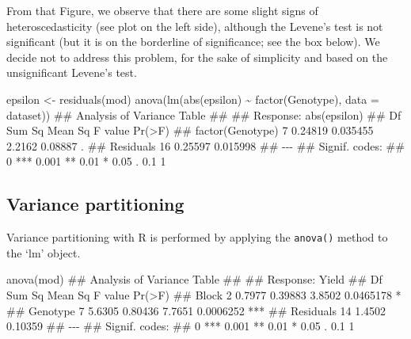 \documentclass[a4paper,12pt,oneside]{book}
\newenvironment{Shaded}{\begin{snugshade}}{\end{snugshade}}
\newcommand{\SpecialCharTok}[1]{#1}
\newcommand{\DocumentationTok}[1]{#1}
\newcommand{\OtherTok}[1]{#1}
\newcommand{\FunctionTok}[1]{#1}
\newcommand{\AttributeTok}[1]{#1}
\newcommand{\NormalTok}[1]{#1}
\begin{document}
From that Figure, we observe that there are some slight signs of heteroscedasticity (see plot on the left side), although the Levene's test is not significant (but it is on the borderline of significance; see the box below). We decide not to address this problem, for the sake of simplicity and based on the unsignificant Levene's test.

\vspace{12pt}

\begin{Shaded}
\begin{Highlighting}[]
\NormalTok{epsilon }\OtherTok{\textless{}{-}} \FunctionTok{residuals}\NormalTok{(mod)}
\FunctionTok{anova}\NormalTok{(}\FunctionTok{lm}\NormalTok{(}\FunctionTok{abs}\NormalTok{(epsilon) }\SpecialCharTok{\textasciitilde{}} \FunctionTok{factor}\NormalTok{(Genotype), }\AttributeTok{data =}\NormalTok{ dataset))}
\DocumentationTok{\#\# Analysis of Variance Table}
\DocumentationTok{\#\# }
\DocumentationTok{\#\# Response: abs(epsilon)}
\DocumentationTok{\#\#                  Df  Sum Sq  Mean Sq F value  Pr(\textgreater{}F)  }
\DocumentationTok{\#\# factor(Genotype)  7 0.24819 0.035455  2.2162 0.08887 .}
\DocumentationTok{\#\# Residuals        16 0.25597 0.015998                  }
\DocumentationTok{\#\# {-}{-}{-}}
\DocumentationTok{\#\# Signif. codes:  }
\DocumentationTok{\#\# 0 \textquotesingle{}***\textquotesingle{} 0.001 \textquotesingle{}**\textquotesingle{} 0.01 \textquotesingle{}*\textquotesingle{} 0.05 \textquotesingle{}.\textquotesingle{} 0.1 \textquotesingle{} \textquotesingle{} 1}
\end{Highlighting}
\end{Shaded}

\hypertarget{variance-partitioning-1}{%
\subsection{Variance partitioning}\label{variance-partitioning-1}}

Variance partitioning with R is performed by applying the \texttt{anova()} method to the `lm' object.

\vspace{12pt}

\begin{Shaded}
\begin{Highlighting}[]
\FunctionTok{anova}\NormalTok{(mod)}
\DocumentationTok{\#\# Analysis of Variance Table}
\DocumentationTok{\#\# }
\DocumentationTok{\#\# Response: Yield}
\DocumentationTok{\#\#           Df Sum Sq Mean Sq F value    Pr(\textgreater{}F)    }
\DocumentationTok{\#\# Block      2 0.7977 0.39883  3.8502 0.0465178 *  }
\DocumentationTok{\#\# Genotype   7 5.6305 0.80436  7.7651 0.0006252 ***}
\DocumentationTok{\#\# Residuals 14 1.4502 0.10359                      }
\DocumentationTok{\#\# {-}{-}{-}}
\DocumentationTok{\#\# Signif. codes:  }
\DocumentationTok{\#\# 0 \textquotesingle{}***\textquotesingle{} 0.001 \textquotesingle{}**\textquotesingle{} 0.01 \textquotesingle{}*\textquotesingle{} 0.05 \textquotesingle{}.\textquotesingle{} 0.1 \textquotesingle{} \textquotesingle{} 1}
\end{Highlighting}
\end{Shaded}
\end{document}
